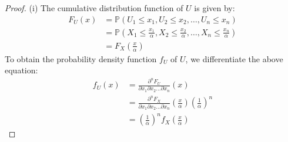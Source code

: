 \documentclass[a4paper,10pt]{article}
\begin{document}
\begin{proof}
    (i) The cumulative distribution function of $U$ is given by:
\begin{align*}
F_U(x) &= \mathbb{P}(U_1 \leq x_1, U_2 \leq x_2, \dots, U_n \leq x_n) \\
&= \mathbb{P}\left(X_1 \leq \frac{x_1}{\alpha}, X_2 \leq \frac{x_2}{\alpha}, \dots, X_n \leq \frac{x_n}{\alpha}\right) \\
&= F_X\left(\frac{x}{\alpha}\right)
\end{align*}
To obtain the probability density function $f_U$ of $U$, we differentiate the above equation:
\begin{align*}
f_U(x) &= \frac{\partial^n F_U}{\partial x_1 \partial x_2 \dots \partial x_n}(x) \\
&= \frac{\partial^n F_X}{\partial x_1 \partial x_2 \dots \partial x_n}\left(\frac{x}{\alpha}\right) \left(\frac{1}{\alpha}\right)^n \\
&= \left(\frac{1}{\alpha}\right)^n f_X\left(\frac{x}{\alpha}\right)
\end{align*}


\end{proof}
\end{document}
